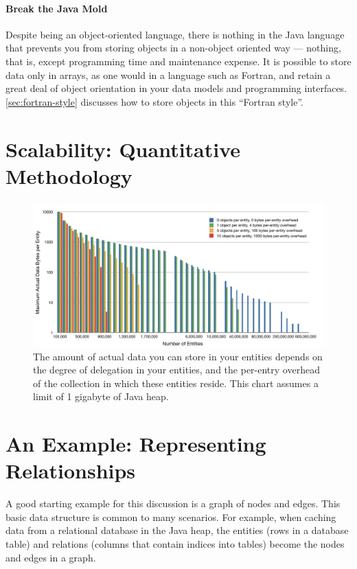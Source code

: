 \paragraph{Break the Java Mold} Despite being an object-oriented language, there
is nothing in the Java language that prevents you from storing objects in a
non-object oriented way --- nothing, that is, except programming time and
maintenance expense. It is possible to store data only in arrays, as one would in
a language such as Fortran, and retain a great deal of object orientation in your
data models and programming interfaces. \autoref{sec:fortran-style} discusses how
to store objects in this ``Fortran style''.

\section{Scalability: Quantitative Methodology}

\begin{figure}
\centering
	\includegraphics[width=\textwidth]{part4/Figures/maxActualData}
	\caption{The amount of actual data you can store in your entities depends on
	the degree of delegation in your entities, and the per-entry overhead of the collection in which these entities
	reside. This chart assumes a limit of 1 gigabyte of Java heap.}
\end{figure}

\section{An Example: Representing Relationships}

A good starting example for this discussion is a graph of nodes and edges. This
basic data structure is common to many scenarios. For example, when caching
data from a relational database in the Java heap, the entities (rows in a
database table) and relations (columns that contain indices into tables) become
the nodes and edges in a graph.

